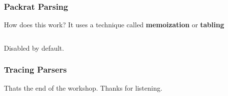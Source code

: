 \documentclass{beamer}
\begin{document}
\begin{frame}
\frametitle{Packrat Parsing}
How does this work? It uses a technique called \textbf{memoization} or \textbf{tabling}

\begin{verbatim}

\end{verbatim}

Disabled by default.
\end{frame}

\begin{frame}
\frametitle{Tracing Parsers}
\end{frame}

\begin{frame}
\begin{center}
Thats the end of the workshop. Thanks for listening.
\end{center}
\end{frame}
\end{document}
